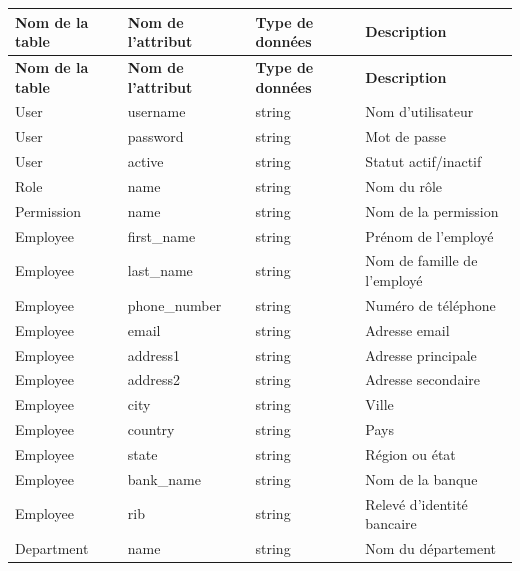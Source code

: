 \renewcommand{\arraystretch}{1.3} %

\begin{longtable}{|p{3.5cm}|p{3.5cm}|p{3cm}|p{5cm}|}
    \hline
    \textbf{Nom de la table} & \textbf{Nom de l'attribut} & \textbf{Type de données} & \textbf{Description} \\
    \hline
    \endfirsthead

    \hline
    \textbf{Nom de la table} & \textbf{Nom de l'attribut} & \textbf{Type de données} & \textbf{Description} \\
    \hline
    \endhead

    \hline
    User & username & string & Nom d'utilisateur \\
    \hline
    User & password & string & Mot de passe \\
    \hline
    User & active & string & Statut actif/inactif \\
    \hline
    
    Role & name & string & Nom du rôle \\
    \hline
    
    Permission & name & string & Nom de la permission \\
    \hline

    Employee & first\_name & string & Prénom de l'employé \\
    \hline
    Employee & last\_name & string & Nom de famille de l'employé \\
    \hline
    Employee & phone\_number & string & Numéro de téléphone \\
    \hline
    Employee & email & string & Adresse email \\
    \hline
    Employee & address1 & string & Adresse principale \\
    \hline
    Employee & address2 & string & Adresse secondaire \\
    \hline
    Employee & city & string & Ville \\
    \hline
    Employee & country & string & Pays \\
    \hline
    Employee & state & string & Région ou état \\
    \hline
    Employee & bank\_name & string & Nom de la banque \\
    \hline
    Employee & rib & string & Relevé d'identité bancaire \\
    \hline

    Department & name & string & Nom du département \\
    \hline


\end{longtable}

